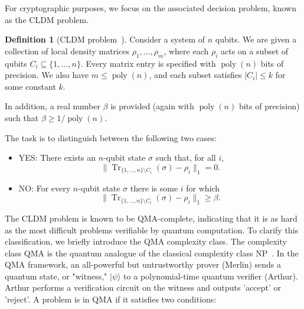 \documentclass[a0,portrait]{a0poster}
\theoremstyle{definition}
\newtheorem{definition}{Definition}
\begin{document}
\begin{multicols}{2}
For cryptographic purposes, we focus on the associated decision problem, known as the CLDM problem. 

\begin{definition}[CLDM problem~\cite{liu2006}]
Consider a system of $n$ qubits.  We are given a collection of local
density matrices $\rho_1,\ldots ,\rho_m$, where each $\rho_i$ acts on a
subset of qubits $C_i\subseteq\{1,\ldots ,n\}$.  Every matrix entry is
specified with $\operatorname{poly}(n)$ bits of precision.  We also have
$m\le\operatorname{poly}(n)$, and each subset satisfies
$\lvert C_i\rvert\le k$ for some constant $k$.

In addition, a real number $\beta$ is provided (again with
$\operatorname{poly}(n)$ bits of precision) such that
$\beta \ge 1/\operatorname{poly}(n)$.

The task is to distinguish between the following two cases:
\begin{itemize}
  \item[]YES: There exists an $n$-qubit state $\sigma$ such that, for
        all $i$,
        \[
          \bigl\lVert
            \operatorname{Tr}_{\{1,\ldots ,n\}\setminus C_i}(\sigma)
            -\rho_i
          \bigr\rVert_1 = 0 .
        \]
  \item[]NO: For every $n$-qubit state $\sigma$ there is some $i$ for
        which
        \[
          \bigl\lVert
            \operatorname{Tr}_{\{1,\ldots ,n\}\setminus C_i}(\sigma)
            -\rho_i
          \bigr\rVert_1 \ge \beta .
        \]
\end{itemize}
\end{definition}

The CLDM problem is known to be QMA-complete, indicating that it is as hard as the most difficult problems verifiable by quantum computation. To clarify this classification, we briefly introduce the QMA complexity class.
The complexity class QMA is the quantum analogue of the classical complexity class NP~\cite{KempeKitaevRegev06}. In the QMA framework, an all-powerful but untrustworthy prover (Merlin) sends a quantum state, or "witness,"  $\vert\psi\rangle$ to a polynomial-time quantum verifier (Arthur). Arthur performs a verification circuit on the witness and outputs 'accept' or 'reject'. A problem is in QMA if it satisfies two conditions:






\end{multicols}
\end{document}
